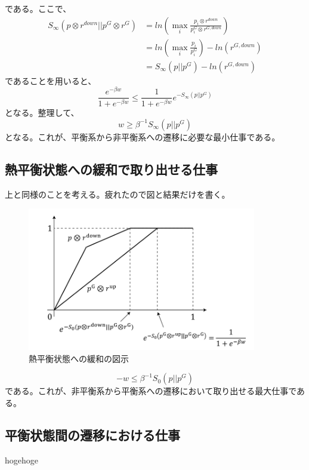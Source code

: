 \documentclass[a4paper,11pt]{jsarticle}
\numberwithin{equation}{section}
\begin{document}
である。ここで、
\begin{align}
    S_{\infty} (p\otimes r^{down}||p^G \otimes r^G) &= ln(\underset{i}{\max}\frac{p_i\otimes r^{down}}{p_i^G \otimes r^{G,down}})\\
    &= ln(\underset{i}{\max}\frac{p_i}{p_i^G})-ln(r^{G,down})\\
    &= S_{\infty}(p||p^G) - ln(r^{G,down})
\end{align}
であることを用いると、
\begin{equation}
    \frac{e^{-\beta w}}{1+e^{-\beta w}} \leq \frac{1}{1+e^{-\beta w}}e^{-S_{\infty}(p||p^G)}
\end{equation}
となる。整理して、
\begin{equation}
    w \geq \beta^{-1}S_{\infty}(p||p^G)
\end{equation}
となる。これが、平衡系から非平衡系への遷移に必要な最小仕事である。\\

\subsection{熱平衡状態への緩和で取り出せる仕事}
上と同様のことを考える。疲れたので図と結果だけを書く。\\
\begin{figure}[H]
    \begin{center}
    \includegraphics[width=100mm]{image6.png}
    \end{center}
    \caption{熱平衡状態への緩和の図示}
    \label{fig:six}
\end{figure}
\begin{equation}
    -w \leq \beta^{-1}S_{0}(p||p^G)
\end{equation}
である。これが、非平衡系から平衡系への遷移において取り出せる最大仕事である。\\

\subsection{平衡状態間の遷移における仕事}
hogehoge
\end{document}
